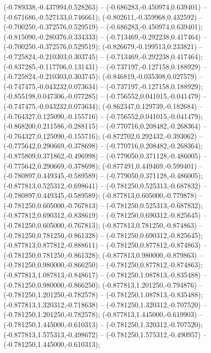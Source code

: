  (-0.789338,-0.437994,0.528263) -- (-0.686283,-0.450974,0.639401) -- (-0.671686,-0.527133,0.746661);
 (-0.802611,-0.359968,0.432592) -- (-0.700250,-0.372576,0.529519) -- (-0.686283,-0.450974,0.639401);
 (-0.815090,-0.280376,0.334333) -- (-0.713469,-0.292238,0.417464) -- (-0.700250,-0.372576,0.529519);
 (-0.826679,-0.199513,0.233821) -- (-0.725824,-0.210303,0.303745) -- (-0.713469,-0.292238,0.417464);
 (-0.837285,-0.117706,0.131431) -- (-0.737197,-0.127158,0.188929) -- (-0.725824,-0.210303,0.303745);
 (-0.846819,-0.035308,0.027579) -- (-0.747475,-0.043232,0.073634) -- (-0.737197,-0.127158,0.188929);
 (-0.855198,0.047306,-0.077285) -- (-0.756552,0.041015,-0.041479) -- (-0.747475,-0.043232,0.073634);
 (-0.862347,0.129739,-0.182684) -- (-0.764327,0.125090,-0.155716) -- (-0.756552,0.041015,-0.041479);
 (-0.868200,0.211586,-0.288115) -- (-0.770716,0.208482,-0.268364) -- (-0.764327,0.125090,-0.155716);
 (-0.872702,0.292432,-0.393062) -- (-0.775642,0.290669,-0.378698) -- (-0.770716,0.208482,-0.268364);
 (-0.875809,0.371862,-0.496998) -- (-0.779050,0.371128,-0.486005) -- (-0.775642,0.290669,-0.378698);
 (-0.877491,0.449469,-0.599401) -- (-0.780897,0.449345,-0.589589) -- (-0.779050,0.371128,-0.486005);
 (-0.877813,0.525312,-0.698641) -- (-0.781250,0.525313,-0.687832) -- (-0.780897,0.449345,-0.589589);
 (-0.877813,0.605000,-0.779878) -- (-0.781250,0.605000,-0.767813) -- (-0.781250,0.525313,-0.687832);
 (-0.877812,0.690312,-0.838619) -- (-0.781250,0.690312,-0.825645) -- (-0.781250,0.605000,-0.767813);
 (-0.877813,0.781250,-0.874863) -- (-0.781250,0.781250,-0.861328) -- (-0.781250,0.690312,-0.825645);
 (-0.877813,0.877812,-0.888611) -- (-0.781250,0.877812,-0.874863) -- (-0.781250,0.781250,-0.861328);
 (-0.877813,0.980000,-0.879863) -- (-0.781250,0.980000,-0.866250) -- (-0.781250,0.877812,-0.874863);
 (-0.877813,1.087813,-0.848617) -- (-0.781250,1.087813,-0.835488) -- (-0.781250,0.980000,-0.866250);
 (-0.877813,1.201250,-0.794876) -- (-0.781250,1.201250,-0.782578) -- (-0.781250,1.087813,-0.835488);
 (-0.877813,1.320312,-0.718638) -- (-0.781250,1.320312,-0.707520) -- (-0.781250,1.201250,-0.782578);
 (-0.877813,1.445000,-0.619903) -- (-0.781250,1.445000,-0.610313) -- (-0.781250,1.320312,-0.707520);
 (-0.877813,1.575313,-0.498672) -- (-0.781250,1.575312,-0.490957) -- (-0.781250,1.445000,-0.610313);
